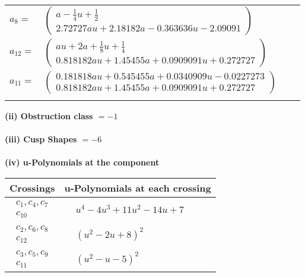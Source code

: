 \documentclass[1p]{elsarticle_modified}
\theoremstyle{definition}
\begin{document}
\begin{tabular}{m{7pt} m{180pt} m{7pt} m{180pt} }
\flushright $a_{8}=$&$\begin{pmatrix}a-\frac{1}{4} u+\frac{1}{2}\\2.72727 a u+2.18182 a-0.363636 u-2.09091\end{pmatrix}$ \\
\flushright $a_{12}=$&$\begin{pmatrix}a u+2 a+\frac{1}{8} u+\frac{1}{4}\\0.818182 a u+1.45455 a+0.0909091 u+0.272727\end{pmatrix}$ \\
\flushright $a_{11}=$&$\begin{pmatrix}0.181818 a u+0.545455 a+0.0340909 u-0.0227273\\0.818182 a u+1.45455 a+0.0909091 u+0.272727\end{pmatrix}$\\&\end{tabular}
\flushleft \textbf{(ii) Obstruction class $= -1$}\\~\\
\flushleft \textbf{(iii) Cusp Shapes $= -6$}\\~\\
\newpage\renewcommand{\arraystretch}{1}
\flushleft \textbf{(iv) u-Polynomials at the component}\newline \\
\begin{tabular}{m{50pt}|m{274pt}}
Crossings & \hspace{64pt}u-Polynomials at each crossing \\
\hline $$\begin{aligned}c_{1},c_{4},c_{7}\\c_{10}\end{aligned}$$&$\begin{aligned}
&u^4-4 u^3+11 u^2-14 u+7
\end{aligned}$\\
\hline $$\begin{aligned}c_{2},c_{6},c_{8}\\c_{12}\end{aligned}$$&$\begin{aligned}
&(u^2-2 u+8)^2
\end{aligned}$\\
\hline $$\begin{aligned}c_{3},c_{5},c_{9}\\c_{11}\end{aligned}$$&$\begin{aligned}
&(u^2- u-5)^2
\end{aligned}$\\
\hline
\end{tabular}\\~\\
\end{document}
